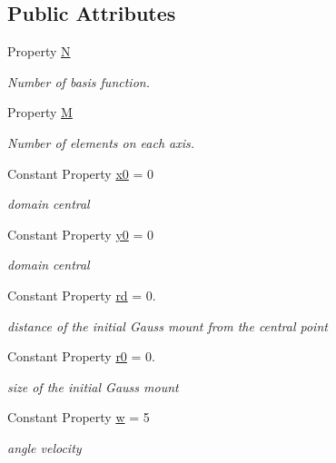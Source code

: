 \subsection*{Public Attributes}
\begin{DoxyCompactItemize}
\item 
Property \hyperlink{class_adv_rotation_uniform_mesh2d_a10a366e7084faf231cd15555c8f48956}{N}
\begin{DoxyCompactList}\small\item\em Number of basis function. \end{DoxyCompactList}\item 
Property \hyperlink{class_adv_rotation_uniform_mesh2d_a6ae00c25344d111a585e32e30954b63b}{M}
\begin{DoxyCompactList}\small\item\em Number of elements on each axis. \end{DoxyCompactList}\item 
Constant Property \hyperlink{class_adv_rotation_uniform_mesh2d_a4275f2f5c620bc0dbec82cb74b75c11e}{x0} = 0
\begin{DoxyCompactList}\small\item\em domain central \end{DoxyCompactList}\item 
Constant Property \hyperlink{class_adv_rotation_uniform_mesh2d_aafac9e69fa69c7d913f806e1ae51c640}{y0} = 0
\begin{DoxyCompactList}\small\item\em domain central \end{DoxyCompactList}\item 
Constant Property \hyperlink{class_adv_rotation_uniform_mesh2d_ac15a3d55210e95460dc9863a1321e8e8}{rd} = 0.
\begin{DoxyCompactList}\small\item\em distance of the initial Gauss mount from the central point \end{DoxyCompactList}\item 
Constant Property \hyperlink{class_adv_rotation_uniform_mesh2d_ac03a35df2b259713f966c7d0b822d229}{r0} = 0.
\begin{DoxyCompactList}\small\item\em size of the initial Gauss mount \end{DoxyCompactList}\item 
Constant Property \hyperlink{class_adv_rotation_uniform_mesh2d_a93449a38808d6f903a3b369df2a01689}{w} = 5
\begin{DoxyCompactList}\small\item\em angle velocity \end{DoxyCompactList}\end{DoxyCompactItemize}
